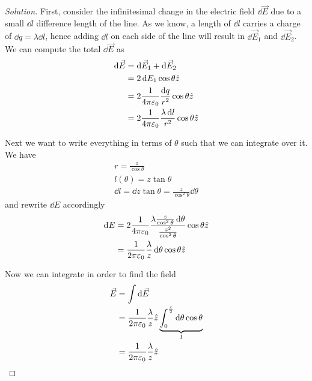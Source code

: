 \documentclass[12pt]{extarticle}
\begin{document}
\begin{proof}[Solution]
	First, consider the infinitesimal change in the electric field $\dd{\vec E}$ due to a small $\dd{l}$ difference length of the line.
	As we know, a length of $\dd{l}$ carries a charge of $\dd{q} = \lambda \dd{l}$, hence adding $\dd{l}$ on each side of the line will result in $\dd{\vec E_1}$ and $\dd{\vec E_2}$.
	We can compute the total $\dd{\vec E}$ as
	\begin{align}
		\dd{\vec E} & = \dd{\vec E_1} + \dd{\vec E_2}                                                \\
		            & = 2 \dd{E_1} \cos \theta \hat z                                                \\
		            & = 2\frac{1}{4 \pi \varepsilon_0} \frac{\dd{q}}{r^2} \cos \theta \hat z         \\
		            & = 2\frac{1}{4 \pi \varepsilon_0} \frac{\lambda \dd{l}}{r^2} \cos \theta \hat z
	\end{align}

	Next we want to write everything in terms of $\theta$ such that we can integrate over it.
	We have
	\begin{gather}
		r         = \frac{z}{\cos \theta}                                      \\
		l(\theta) = z \tan \theta                                              \\
		\dd{l}    = \dd{z \tan \theta} = \frac{z}{\cos^2 \theta} \dd{\theta}
	\end{gather}
	and rewrite $\dd{E}$ accordingly
	\begin{align}
		\dd{E} & = 2\frac{1}{4 \pi \varepsilon_0} \frac{\lambda \frac{z}{\cos^2 \theta} \dd{\theta}}{\frac{z^2}{\cos^2 \theta}} \cos \theta \hat z \\
		       & = \frac{1}{2 \pi \varepsilon_0} \frac{\lambda}{z} \dd{\theta} \cos \theta \hat z
	\end{align}

	Now we can integrate in order to find the field
	\begin{align}
		\vec E & = \int \dd{\vec E}                                                                                                       \\
		       & = \frac{1}{2 \pi \varepsilon_0} \frac{\lambda}{z} \hat z \underbrace{\int_0^{\frac{\pi}{2}} \dd{\theta} \cos \theta}_{1} \\
		       & = \frac{1}{2 \pi \varepsilon_0} \frac{\lambda}{z} \hat z
	\end{align}
\end{proof}
\end{document}
